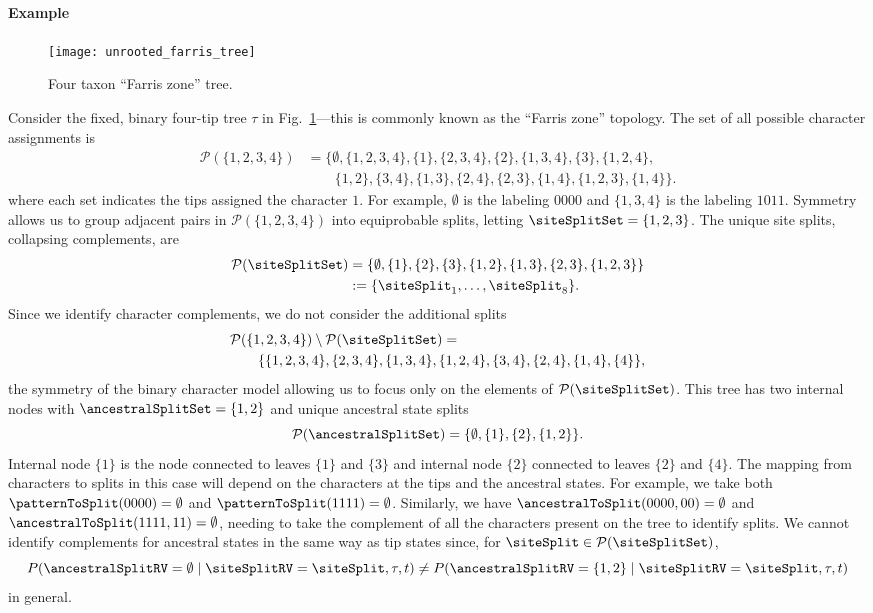 \paragraph{Example}
\begin{figure}
    \centering
    \texttt{[image: unrooted\_farris\_tree]}
    \caption{Four taxon ``Farris zone'' tree.}
\label{fig:four-taxa-tree}
\end{figure}

Consider the fixed, binary four-tip tree $\tau$ in Fig.~\ref{fig:four-taxa-tree}---this is commonly known as the ``Farris zone'' topology.
The set of all possible character assignments is
\begin{align*}
\mathcal{P}(\{1,2,3,4\}) &= \{\emptyset, \{1,2,3,4\}, \{1\}, \{2,3,4\}, \{2\}, \{1,3,4\}, \{3\}, \{1,2,4\}, \\
                         &\qquad \{1,2\}, \{3,4\}, \{1,3\}, \{2,4\}, \{2,3\}, \{1,4\}, \{1,2,3\}, \{1,4\}\}.
\end{align*}
where each set indicates the tips assigned the character $1$.
For example, $\emptyset$ is the labeling $0000$ and $\{1,3,4\}$ is the labeling $1011$.
Symmetry allows us to group adjacent pairs in $\mathcal{P}(\{1,2,3,4\})$ into equiprobable splits, letting $\siteSplitSet=\{1,2,3\}$.
The unique site splits, collapsing complements, are
\begin{align*}
    \mathcal{P}(\siteSplitSet) &= \{\emptyset, \{1\}, \{2\}, \{3\}, \{1,2\}, \{1,3\}, \{2,3\}, \{1,2,3\}\} \\
& := \{\siteSplit_1, \ldots, \siteSplit_8\}.
\end{align*}
Since we identify character complements, we do not consider the additional splits
\begin{equation*}
\begin{split}
& \mathcal{P}(\{1,2,3,4\}) \setminus \mathcal{P}(\siteSplitSet) = \\
&\qquad \{\{1,2,3,4\}, \{2,3,4\}, \{1,3,4\}, \{1,2,4\}, \{3,4\}, \{2,4\}, \{1,4\}, \{4\}\},
\end{split}
\end{equation*}
the symmetry of the binary character model allowing us to focus only on the elements of $\mathcal{P}(\siteSplitSet)$.
This tree has two internal nodes with $\ancestralSplitSet=\{1,2\}$ and unique ancestral state splits
$$
\mathcal{P}(\ancestralSplitSet) = \{\emptyset, \{1\}, \{2\}, \{1,2\}\}.
$$
Internal node $\{1\}$ is the node connected to leaves $\{1\}$ and $\{3\}$ and internal node $\{2\}$ connected to leaves $\{2\}$ and $\{4\}$.
The mapping from characters to splits in this case will depend on the characters at the tips and the ancestral states.
For example, we take both $\patternToSplit(0000)=\emptyset$ and $\patternToSplit(1111)=\emptyset$.
Similarly, we have $\ancestralToSplit(0000, 00) = \emptyset$ and $\ancestralToSplit(1111, 11)=\emptyset$, needing to take the complement of all the characters present on the tree to identify splits.
We cannot identify complements for ancestral states in the same way as tip states since, for $\siteSplit\in\mathcal{P}(\siteSplitSet)$,
$$
P(\ancestralSplitRV=\emptyset \mid \siteSplitRV=\siteSplit, \tau, t)\neq P(\ancestralSplitRV=\{1,2\} \mid \siteSplitRV=\siteSplit, \tau, t)
$$
in general.

